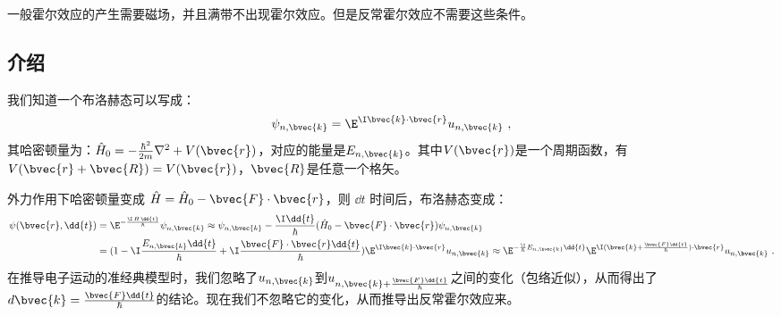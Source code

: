 \begin{issues}
\issueDraft
\end{issues}
一般霍尔效应的产生需要磁场，并且满带不出现霍尔效应。但是反常霍尔效应不需要这些条件。
\subsection{介绍}
我们知道一个布洛赫态可以写成：
\begin{equation}
\psi_{n,\bvec{k}}=\E^{\I\bvec{k}\cdot\bvec{r}}u_{n,\bvec{k}}~,
\end{equation}
其哈密顿量为：$\hat H_0=-\frac{\hbar^2}{2m}\nabla^2+V(\bvec{r})$，对应的能量是$E_{n,\bvec{k}}$。其中$V(\bvec{r})$是一个周期函数，有$V(\bvec{r}+\bvec{R})=V(\bvec{r})$，$\bvec{R}$是任意一个格矢。

外力作用下哈密顿量变成 $\hat H =\hat H_0 -\bvec{F}\cdot\bvec{r}$，则 $\dd{t}$ 时间后，布洛赫态变成：
\begin{equation}
\begin{aligned}
\psi(\bvec{r},\dd{t})&=\E^{-\frac{\I\,\hat H\,\dd{t}}{\hbar}}\psi_{n,\bvec{k}} \approx \psi_{n,\bvec{k}}-\frac{\I\dd{t}}{\hbar}(\hat H_0 -\bvec{F}\cdot\bvec{r})\psi_{n,\bvec{k}}\\
&=(1-\I \frac{E_{n,\bvec{k}}\dd{t}}{\hbar}+\I\frac{\bvec{F}\cdot\bvec{r}\dd{t}}{\hbar})\E^{\I\bvec{k}\cdot\bvec{r}}u_{n,\bvec{k}}
\approx \E^{-\frac{\I}{\hbar}E_{n,\bvec{k}}\dd{t}}\E^{\I(\bvec{k}+\frac{\bvec{F}\dd{t}}{\hbar})\cdot \bvec{r}}u_{n,\bvec{k}}~.
\end{aligned}
\end{equation}
在推导电子运动的准经典模型时，我们忽略了$u_{n,\bvec{k}}$到$u_{n,\bvec{k}+\frac{\bvec{F}\dd{t}}{\hbar}}$之间的变化（包络近似），从而得出了$d\bvec{k}=\frac{\bvec{F}\dd{t}}{\hbar}$的结论。现在我们不忽略它的变化，从而推导出反常霍尔效应来。

